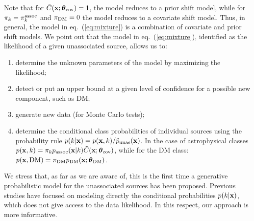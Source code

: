 \documentclass[12pt, a4paper]{article}
\newcommand{\dima}[1]{\textcolor{purple}{{Dima: #1}}}
\newcommand{\ben}{\begin{enumerate}}
\newcommand{\een}{\end{enumerate}}
\newcommand{\bx}{{\bf x}}
\newcommand{\btheta}{\boldsymbol{\theta}}
\begin{document}
Note that for $\tilde{C}(\bx; \btheta_{\rm cov}) = 1$, the model reduces to a prior shift model, while for $\pi_k = \pi_k^{\rm assoc}$ and $\pi_{\rm DM} = 0$ the model reduces to a covariate shift model.
Thus, in general, the model in eq.~(\ref{eq:mixture}) is a combination of covariate and prior shift models. We point out that the model in eq.~(\ref{eq:mixture}), identified as the likelihood of a given unassociated source, %
allows us to:
\ben
\item
determine the unknown parameters of the model by maximizing the likelihood;
\item
detect or put an upper bound at a given level of confidence for a possible new component, such as DM;
\item
generate new data (for Monte Carlo tests);
\item
determine the conditional class probabilities of individual sources using the probability rule
$p(k|\bx) = p(\bx, k)/\tilde{p}_{\rm unas}(\bx)$. In the case of astrophysical classes 
$p(\bx, k) = \pi_k p_{\rm assoc}(\bx|k) \tilde{C}(\bx; \btheta_{\rm cov})$, while
for the DM class: $p(\bx, {\rm DM}) = \pi_{\rm DM} p_{\rm DM}(\bx; \btheta_{\rm DM})$.
\een

We stress that, as far as we are aware of, this is the first time a generative probabilistic model for the unassociated sources has been proposed. Previous studies have focused on modeling directly the conditional probabilities $p(k|\bx)$, which does not give access to the data likelihood. In this respect, our approach is more informative.

\end{document}
